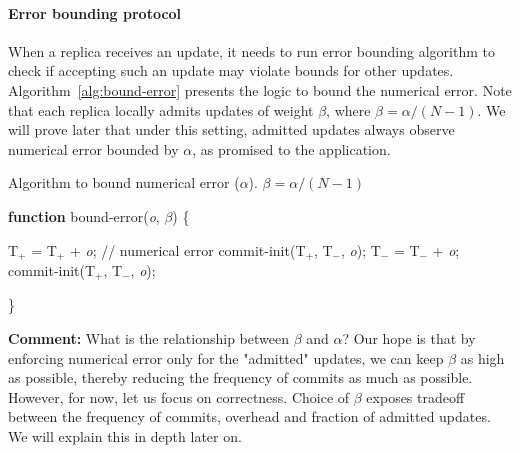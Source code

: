 \documentclass[twocolumn,10pt]{article}
\begin{document}
{\paragraph{Error bounding protocol} When a replica receives an
update, it needs to run error bounding 
algorithm to check if accepting such an update may violate bounds
for other updates. Algorithm~\ref{alg:bound-error} presents the 
logic to bound the numerical error. Note that each replica locally
admits updates of weight $\beta$, where $\beta=\alpha/(N-1)$. We will
prove later that under this setting, admitted updates always observe numerical
error bounded by $\alpha$, as promised to the application.

\begin{algorithm}%
\caption{Algorithm to bound numerical error ($\alpha$). $\beta=\alpha/(N-1)$}
\textbf{function} bound-error(\textit{o}, $\beta$) \{
\begin{algorithmic}[1]\label{alg:bound-error}
{}
\STATE T$_{+}$ = T$_{+}$ + \textit{o};
\STATE // numerical error
\STATE commit-init(T$_{+}$, T$_{-}$, \textit{o});
\ENDIF
\ELSE
\STATE T$_{-}$ = T$_{-}$ + \textit{o};
\STATE commit-init(T$_{+}$, T$_{-}$, \textit{o});
\ENDIF
\ENDIF
\end{algorithmic}
\}
\end{algorithm}

\textbf{Comment:} What is the relationship between $\beta$ and $\alpha$?
Our hope is that by enforcing numerical error only for the "admitted"
updates, we can keep $\beta$ as high as possible, thereby reducing the
frequency of commits as much as possible. However, for now, let us
focus on correctness. Choice of $\beta$ exposes tradeoff between
the frequency of commits, overhead and fraction of admitted
updates. We will explain this in depth later on.

}
\end{document}
